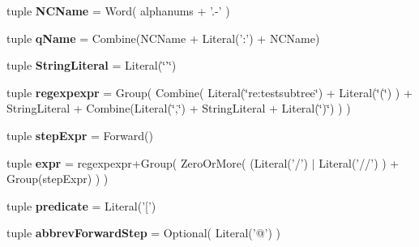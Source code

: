 \begin{DoxyCompactItemize}
\item 
\hypertarget{classxutools_1_1parsers_1_1_x_path_parser_aeefaed59c8c53cbd2af664b6abc6aa0e}{tuple {\bfseries N\-C\-Name} = Word( alphanums + '.-\/' )}\label{classxutools_1_1parsers_1_1_x_path_parser_aeefaed59c8c53cbd2af664b6abc6aa0e}

\item 
\hypertarget{classxutools_1_1parsers_1_1_x_path_parser_a646902ba4307457e0799379772507953}{tuple {\bfseries q\-Name} = Combine(N\-C\-Name + Literal('\-:') + N\-C\-Name)}\label{classxutools_1_1parsers_1_1_x_path_parser_a646902ba4307457e0799379772507953}

\item 
\hypertarget{classxutools_1_1parsers_1_1_x_path_parser_ad27f986ed5578cf6dd41fc86086e8732}{tuple {\bfseries String\-Literal} = Literal(\char`\"{}'\char`\"{})}\label{classxutools_1_1parsers_1_1_x_path_parser_ad27f986ed5578cf6dd41fc86086e8732}

\item 
\hypertarget{classxutools_1_1parsers_1_1_x_path_parser_a638e977022020a59924c0d953f920493}{tuple {\bfseries regexpexpr} = Group( Combine( Literal(\char`\"{}re\-:testsubtree\char`\"{}) + Literal(\char`\"{}(\char`\"{}) ) + String\-Literal + Combine(Literal(\char`\"{},\char`\"{}) + String\-Literal + Literal(\char`\"{})\char`\"{}) ) )}\label{classxutools_1_1parsers_1_1_x_path_parser_a638e977022020a59924c0d953f920493}

\item 
\hypertarget{classxutools_1_1parsers_1_1_x_path_parser_a56ec81d6671f391e90a5ac490c867120}{tuple {\bfseries step\-Expr} = Forward()}\label{classxutools_1_1parsers_1_1_x_path_parser_a56ec81d6671f391e90a5ac490c867120}

\item 
\hypertarget{classxutools_1_1parsers_1_1_x_path_parser_a33eab7023ad4b6742c4faed8730c2982}{tuple {\bfseries expr} = regexpexpr+Group( Zero\-Or\-More( (Literal('/') $|$ Literal('//') ) + Group(step\-Expr) ) )}\label{classxutools_1_1parsers_1_1_x_path_parser_a33eab7023ad4b6742c4faed8730c2982}

\item 
\hypertarget{classxutools_1_1parsers_1_1_x_path_parser_aef54c8382ad623182c8fa80f4464cf1c}{tuple {\bfseries predicate} = Literal('\mbox{[}')}\label{classxutools_1_1parsers_1_1_x_path_parser_aef54c8382ad623182c8fa80f4464cf1c}

\item 
\hypertarget{classxutools_1_1parsers_1_1_x_path_parser_ababb9d35b3b3b166f16a5ecbc5d31844}{tuple {\bfseries abbrev\-Forward\-Step} = Optional( Literal('@') )}\label{classxutools_1_1parsers_1_1_x_path_parser_ababb9d35b3b3b166f16a5ecbc5d31844}


\end{DoxyCompactItemize}
